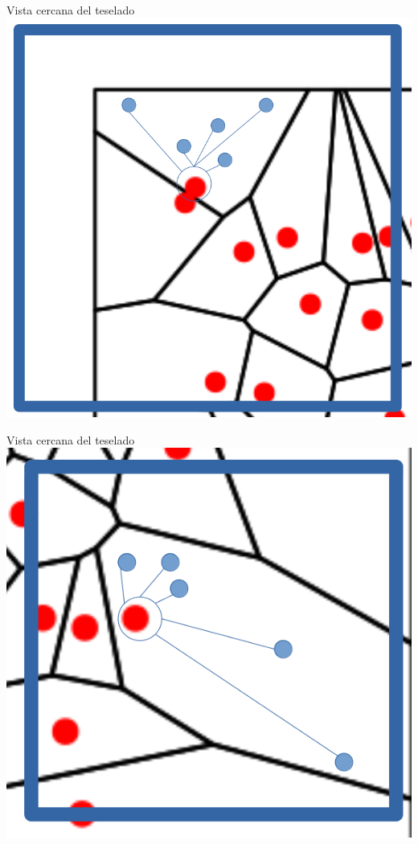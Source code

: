 \documentclass[
  11pt,
  ignorenonframetext,
]{beamer}
\begin{document}
\begin{frame}{Vista cercana del teselado}
\protect\hypertarget{vista-cercana-del-teselado}{}
\includegraphics{Interpolacion/Voronoi-cerca-0.png}
\end{frame}

\begin{frame}{Vista cercana del teselado}
\protect\hypertarget{vista-cercana-del-teselado-1}{}
\includegraphics{Interpolacion/Voronoi-cerca-1.png}
\end{frame}
\end{document}
